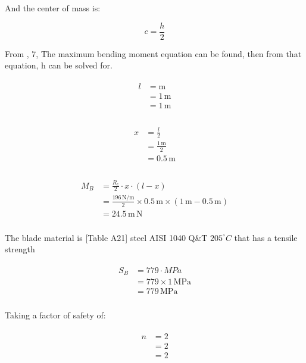 \documentclass{article}
\begin{document}
And the center of mass is:

\begin{equation}
c=\frac{h}{2}
\end{equation}

From \cite[Table A-9]{shigley}, 7, The maximum bending moment equation can be found, then from that equation, h can be solved for.

\begin{align}
\begin{split}
l	&= \mathrm{m}\\
	&= 1\,\mathrm{m}\\
	&= 1\,\mathrm{m}\\
\end{split}
\end{align}

\begin{align}
\begin{split}
x	&= \frac{l}{2}\\
	&= \frac{1\,\mathrm{m}}{2}\\
	&= 0.5\,\mathrm{m}\\
\end{split}
\end{align}

\begin{align}
\begin{split}
M_{B}	&= \frac{R_{c}}{2} \cdot x \cdot \left(l - x\right)\\
		&= \frac{196\,\mathrm{{N}\slash{m}}}{2} \times 0.5\,\mathrm{m} \times \left(1\,\mathrm{m} - 0.5\,\mathrm{m}\right)\\
		&= 24.5\,\mathrm{m \, N}\\
\end{split}
\end{align}

The blade material is [Table A21] steel AISI 1040 Q\&T $205^\circ C$ that has a tensile strength

\begin{align}
\begin{split}
S_{B}	&= 779 \cdot MPa\\
		&= 779 \times 1\,\mathrm{MPa}\\
		&= 779\,\mathrm{MPa}\\
\end{split}
\end{align}

Taking a factor of safety of:

\begin{align}
\begin{split}
n	&= 2\\
	&= 2\\
	&= 2\\
\end{split}
\end{align}
\end{document}
